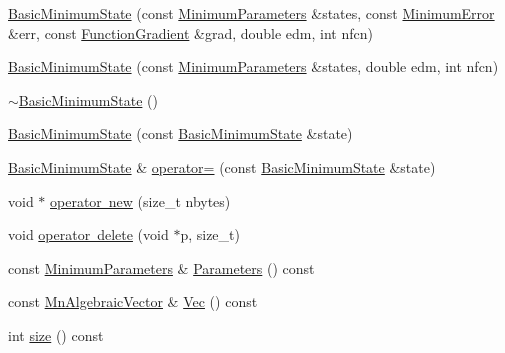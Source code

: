 \begin{DoxyCompactItemize}
\item 
\mbox{\hyperlink{classROOT_1_1Minuit2_1_1BasicMinimumState_af7498cdda17a96e7a93dbd22862a73cc}{Basic\+Minimum\+State}} (const \mbox{\hyperlink{classROOT_1_1Minuit2_1_1MinimumParameters}{Minimum\+Parameters}} \&states, const \mbox{\hyperlink{classROOT_1_1Minuit2_1_1MinimumError}{Minimum\+Error}} \&err, const \mbox{\hyperlink{classROOT_1_1Minuit2_1_1FunctionGradient}{Function\+Gradient}} \&grad, double edm, int nfcn)
\item 
\mbox{\hyperlink{classROOT_1_1Minuit2_1_1BasicMinimumState_ac01b76fd4f72db80c4e86766c51a5f44}{Basic\+Minimum\+State}} (const \mbox{\hyperlink{classROOT_1_1Minuit2_1_1MinimumParameters}{Minimum\+Parameters}} \&states, double edm, int nfcn)
\item 
\mbox{\hyperlink{classROOT_1_1Minuit2_1_1BasicMinimumState_ae9724fa5e9d8a2f5403ac0a131bfbe91}{$\sim$\+Basic\+Minimum\+State}} ()
\item 
\mbox{\hyperlink{classROOT_1_1Minuit2_1_1BasicMinimumState_af76fc4a4cc111099fd188e145fa82b5c}{Basic\+Minimum\+State}} (const \mbox{\hyperlink{classROOT_1_1Minuit2_1_1BasicMinimumState}{Basic\+Minimum\+State}} \&state)
\item 
\mbox{\hyperlink{classROOT_1_1Minuit2_1_1BasicMinimumState}{Basic\+Minimum\+State}} \& \mbox{\hyperlink{classROOT_1_1Minuit2_1_1BasicMinimumState_a68cf1c28f5f728fa62a0c39ff943a2bf}{operator=}} (const \mbox{\hyperlink{classROOT_1_1Minuit2_1_1BasicMinimumState}{Basic\+Minimum\+State}} \&state)
\item 
void $\ast$ \mbox{\hyperlink{classROOT_1_1Minuit2_1_1BasicMinimumState_ad0e5ab496757c5bee3544485a49fe7aa}{operator new}} (size\+\_\+t nbytes)
\item 
void \mbox{\hyperlink{classROOT_1_1Minuit2_1_1BasicMinimumState_a19ccca7f7825c16fca3c7ab6f147fdd6}{operator delete}} (void $\ast$p, size\+\_\+t)
\item 
const \mbox{\hyperlink{classROOT_1_1Minuit2_1_1MinimumParameters}{Minimum\+Parameters}} \& \mbox{\hyperlink{classROOT_1_1Minuit2_1_1BasicMinimumState_a0b72fce84557374c989a6581711e6e6a}{Parameters}} () const
\item 
const \mbox{\hyperlink{namespaceROOT_1_1Minuit2_a62ed97730a1ca8d3fbaec64a19aa11c9}{Mn\+Algebraic\+Vector}} \& \mbox{\hyperlink{classROOT_1_1Minuit2_1_1BasicMinimumState_a43ea742b5bd55d2c4e9d6b75308fb875}{Vec}} () const
\item 
int \mbox{\hyperlink{classROOT_1_1Minuit2_1_1BasicMinimumState_a12c3b0b51b127384c53029c54c984590}{size}} () const
\item 

\end{DoxyCompactItemize}
